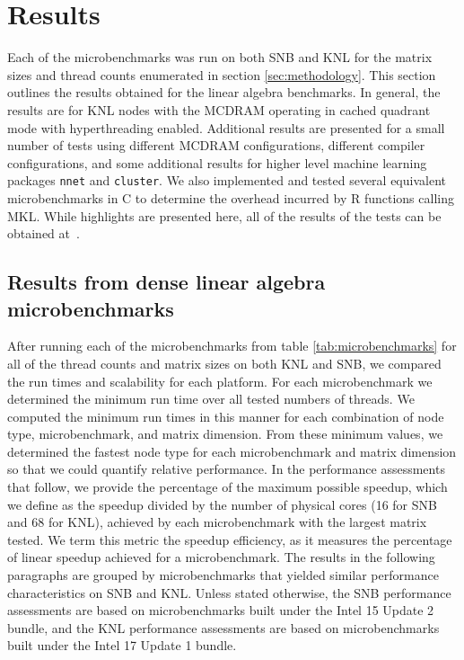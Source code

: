\section{Results} \label{sec:results}

Each of the microbenchmarks was run on both SNB and KNL for the matrix sizes and thread
counts enumerated in section \ref{sec:methodology}. This section outlines the results
obtained for the linear algebra benchmarks. In general, the results are for KNL
nodes with the MCDRAM operating in cached quadrant mode with hyperthreading enabled.
Additional results are presented for a small number of tests using different MCDRAM
configurations, different compiler configurations, and some additional results for higher
level machine learning packages \texttt{nnet} and \texttt{cluster}. We also implemented
and tested several equivalent microbenchmarks in C to determine the overhead incurred by R
functions calling MKL. While highlights are presented here, all of the results of the
tests can be obtained at~\cite{iu:stamp2017}.

\subsection{Results from dense linear algebra microbenchmarks}

After running each of the microbenchmarks from table \ref{tab:microbenchmarks} for all of
the thread counts and matrix sizes on both KNL and SNB, we compared the run times and
scalability for each platform. For each microbenchmark we determined the minimum run time
over all tested numbers of threads. We computed the minimum run times in this manner for
each combination of node type, microbenchmark, and matrix dimension. From these minimum
values, we determined the fastest node type for each microbenchmark and matrix dimension
so that we could quantify relative performance. In the performance assessments that
follow, we provide the percentage of the maximum possible speedup, which we define as the
speedup divided by the number of physical cores (16 for SNB and 68 for KNL), achieved by
each microbenchmark with the largest matrix tested. We term this metric the speedup efficiency,
as it measures the percentage of linear speedup achieved for a microbenchmark. The results in
the following paragraphs are grouped by microbenchmarks that yielded similar performance
characteristics on SNB and KNL. Unless stated otherwise, the SNB performance assessments
are based on microbenchmarks built under the Intel 15 Update 2 bundle, and the KNL
performance assessments are based on microbenchmarks built under the Intel 17 Update 1
bundle.

